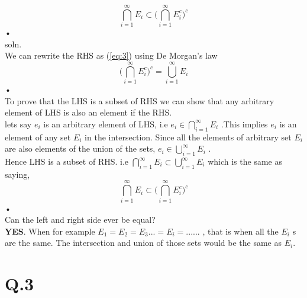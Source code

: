 \documentclass[a4paper,11pt]{article}
\begin{document}
\begin{equation}
\bigcap\limits_{i=1}^{\infty}E_{i} \subset\Bigg(\bigcap\limits_{i=1}^{\infty}E_{i}^c\Bigg)^c 
\end{equation}•\\
soln.\\
We can rewrite the RHS as (\ref{eq:3}) using De Morgan's law\\
\begin{equation}\label{eq:3}
\Bigg(\bigcap\limits_{i=1}^{\infty}E_{i}^c\Bigg)^c = \bigcup\limits_{i=1}^{\infty}E_{i} 
\end{equation}•\\
To prove that the LHS is a subset of RHS we can show that any arbitrary element of LHS is also an element if the RHS.\\
lets say $e_{i}$ is an arbitrary element of LHS,  i.e $e_{i} \in \bigcap\limits_{i=1}^{\infty}E_{i} $ .This implies 
$e_{i}$ is an element of any set $E_{i}$ in the intersection. Since all the elements of arbitrary set $E_{i}$ are also  elements of the union of the sets, $e_{i} \in \bigcup\limits_{i=1}^{\infty}E_{i}$ .\\
Hence LHS is a subset of RHS. i.e $\bigcap\limits_{i=1}^{\infty}E_{i} \subset  \bigcup\limits_{i=1}^{\infty}E_{i} $
which is the same as saying,\\
\begin{equation}
\bigcap\limits_{i=1}^{\infty}E_{i} \subset\Bigg(\bigcap\limits_{i=1}^{\infty}E_{i}^c\Bigg)^c 
\end{equation}•\\
 Can the left and right side ever be equal?\\
 \textbf{YES}. When for example $E_{1}=E_{2}=E_{3}...=E_{i}=......$ , that is when all the $E_{i}$ s are the same.
 The intersection and union of those sets would be the same as  $E_{i}$.
\newpage
\section*{Q.3\quad }
\end{document}
